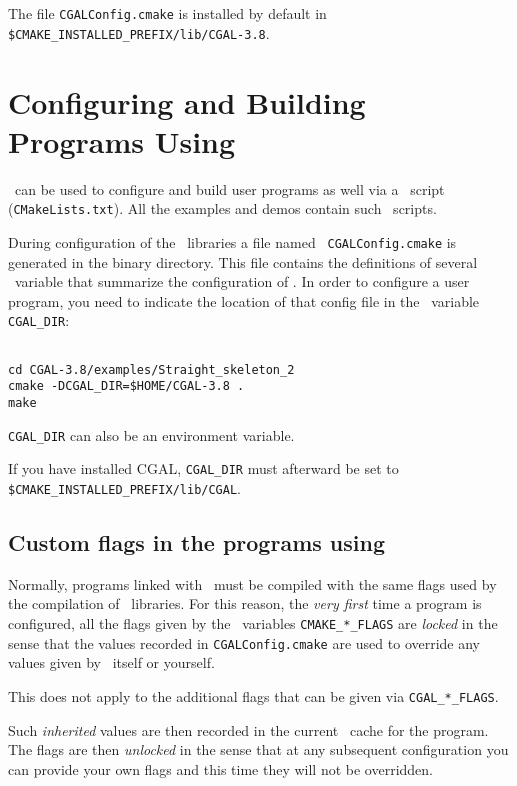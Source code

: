 The file \texttt{CGALConfig.cmake} is installed by default in
\texttt{\$CMAKE\_INSTALLED\_PREFIX/lib/CGAL-3.8}.


\section{Configuring and Building Programs Using \cgal}

\cmake\ can be used to configure and build user programs as well via a \cmake\ 
script ({\tt CMakeLists.txt}).  All the examples and
demos contain such \cmake\ scripts.

During configuration of the \cgal\ libraries a file named {\tt
CGALConfig.cmake} is generated in the binary directory. This file
contains the definitions of several \cmake\ variable that summarize the
configuration of \cgal. In order to configure a user program, you need
to indicate the location of that config file in the \cmake\ variable
\texttt{CGAL\_DIR}:

{\ccTexHtml{\scriptsize}{}
\begin{verbatim}

cd CGAL-3.8/examples/Straight_skeleton_2
cmake -DCGAL_DIR=$HOME/CGAL-3.8 .
make

\end{verbatim}
}

\texttt{CGAL\_DIR} can also be an environment variable.

If you have installed CGAL, \texttt{CGAL\_DIR} must afterward be set to
\texttt{\$CMAKE\_INSTALLED\_PREFIX/lib/CGAL}.

\subsection{Custom flags in the programs using \cgal}

Normally, programs linked with \cgal\ must be compiled with the same flags
used by the compilation of \cgal\
libraries. For this reason, the {\em very first} time
a program is configured, all the flags given by the \cmake\ variables \texttt{CMAKE\_*\_FLAGS}
are {\em locked} in the sense that the values recorded in \texttt{CGALConfig.cmake} 
are used to override any values given by \cmake\ itself or yourself.

This does not apply to the additional flags that can be given via \texttt{CGAL\_*\_FLAGS}.

Such {\em inherited} values are then recorded in the current \cmake\ cache for the program.
The flags are then {\em unlocked} in the sense that at any subsequent configuration you can
provide your own flags and this time they will not be overridden.

